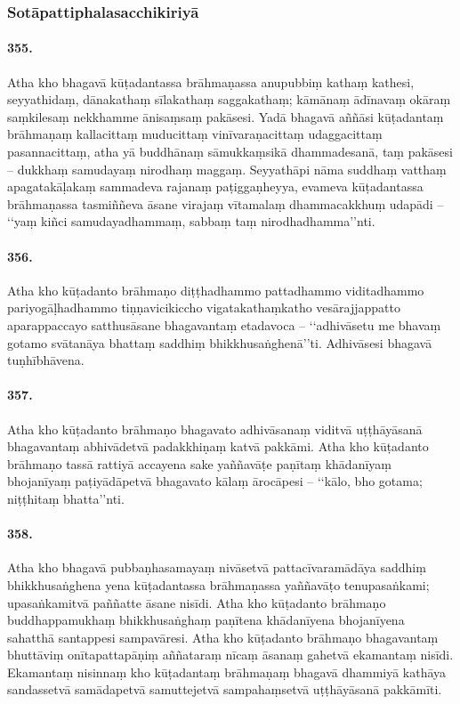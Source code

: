 \subsubsection{Sotāpattiphalasacchikiriyā}

\paragraph{355.} Atha kho bhagavā kūṭadantassa brāhmaṇassa anupubbiṃ kathaṃ kathesi, seyyathidaṃ, dānakathaṃ sīlakathaṃ saggakathaṃ; kāmānaṃ ādīnavaṃ okāraṃ saṃkilesaṃ nekkhamme ānisaṃsaṃ pakāsesi. Yadā bhagavā aññāsi kūṭadantaṃ brāhmaṇaṃ kallacittaṃ muducittaṃ vinīvaraṇacittaṃ udaggacittaṃ pasannacittaṃ, atha yā buddhānaṃ sāmukkaṃsikā dhammadesanā, taṃ pakāsesi – dukkhaṃ samudayaṃ nirodhaṃ maggaṃ. Seyyathāpi nāma suddhaṃ vatthaṃ apagatakāḷakaṃ sammadeva rajanaṃ paṭiggaṇheyya, evameva kūṭadantassa brāhmaṇassa tasmiññeva āsane virajaṃ vītamalaṃ dhammacakkhuṃ udapādi – ‘‘yaṃ kiñci samudayadhammaṃ, sabbaṃ taṃ nirodhadhamma’’nti.

\paragraph{356.} Atha kho kūṭadanto brāhmaṇo diṭṭhadhammo pattadhammo viditadhammo pariyogāḷhadhammo tiṇṇavicikiccho vigatakathaṃkatho vesārajjappatto aparappaccayo satthusāsane bhagavantaṃ etadavoca – ‘‘adhivāsetu me bhavaṃ gotamo svātanāya bhattaṃ saddhiṃ bhikkhusaṅghenā’’ti. Adhivāsesi bhagavā tuṇhībhāvena.

\paragraph{357.} Atha kho kūṭadanto brāhmaṇo bhagavato adhivāsanaṃ viditvā uṭṭhāyāsanā bhagavantaṃ abhivādetvā padakkhiṇaṃ katvā pakkāmi. Atha kho kūṭadanto brāhmaṇo tassā rattiyā accayena sake yaññavāṭe paṇītaṃ khādanīyaṃ bhojanīyaṃ paṭiyādāpetvā bhagavato kālaṃ ārocāpesi – ‘‘kālo, bho gotama; niṭṭhitaṃ bhatta’’nti.

\paragraph{358.} Atha kho bhagavā pubbaṇhasamayaṃ nivāsetvā pattacīvaramādāya saddhiṃ bhikkhusaṅghena yena kūṭadantassa brāhmaṇassa yaññavāṭo tenupasaṅkami; upasaṅkamitvā paññatte āsane nisīdi. Atha kho kūṭadanto brāhmaṇo buddhappamukhaṃ bhikkhusaṅghaṃ paṇītena khādanīyena bhojanīyena sahatthā santappesi sampavāresi. Atha kho kūṭadanto brāhmaṇo bhagavantaṃ bhuttāviṃ onītapattapāṇiṃ aññataraṃ nīcaṃ āsanaṃ gahetvā ekamantaṃ nisīdi. Ekamantaṃ nisinnaṃ kho kūṭadantaṃ brāhmaṇaṃ bhagavā dhammiyā kathāya sandassetvā samādapetvā samuttejetvā sampahaṃsetvā uṭṭhāyāsanā pakkāmīti.

